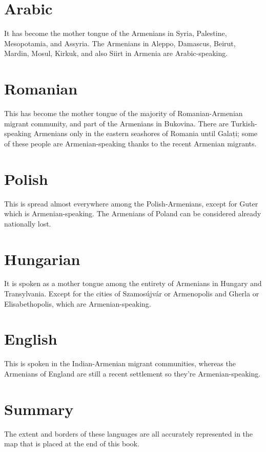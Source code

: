 \section{Arabic}\label{sec:Langauges:Arabic}

It has become the mother tongue of the Armenians in Syria, Palestine, Mesopotamia, and Assyria. The Armenians in Aleppo, Damascus, Beirut, Mardin, Mosul, Kirkuk, and also Siirt in Armenia are Arabic-speaking. 

\section{Romanian}

This has become the mother tongue of the majority of Romanian-Armenian migrant community, and part of the Armenians in Bukovina. There are Turkish-speaking Armenians only in the eastern seashores of Romania until Galați; some of these people are Armenian-speaking thanks to the recent Armenian migrants. 

\section{Polish}

This is spread almost everywhere among the Polish-Armenians, except for Guter which is Armenian-speaking. The Armenians of Poland can be considered already nationally lost.

\section{Hungarian}

It is spoken as a mother tongue among the entirety of Armenians in Hungary and Transylvania. Except for the cities of Szamosújvár or Armenopolis and Gherla or Elisabethopolis, which are Armenian-speaking.


\section{English}

This is spoken in the Indian-Armenian migrant communities, whereas the Armenians of England are still a recent settlement so they're Armenian-speaking. 

\section{Summary}
The extent and borders of these languages are all accurately represented in the map that is placed at the end of this book. 



